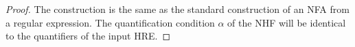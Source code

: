 \begin{proof}
The construction is the same as the standard construction of an NFA from 
a regular expression. The quantification condition $\alpha$ of the NHF will be 
identical to the quantifiers of the input HRE. 
\end{proof}





% 
% 
% 
% 
% 



